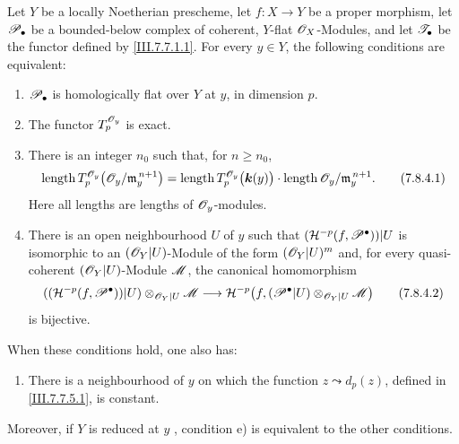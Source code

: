 \begin{proposition}[7.8.4]
\label{III.7.8.4}
Let $Y$ be a locally Noetherian prescheme, let
$f:X\to Y$ be a proper morphism, let $\mathscr{P}_\bullet$ be a
bounded-below complex of coherent, $Y$-flat
$\mathscr{O}_X$-Modules, and let $\mathscr{T}_\bullet$ be the functor
defined by \eqref{III.7.7.1.1}.  For every $y\in Y$, the
following conditions are equivalent:
\begin{enumerate}
  \item[\textup{a)}] $\mathscr{P}_\bullet$ is homologically flat over $Y$
  at $y$, in dimension $p$.
  \item[\textup{b)}] The functor $T_p^{\mathscr{O}_y}$ is exact.
  \item[\textup{c)}] There is an integer $n_0$ such that, for
  $n\geq n_0$,
  \[
    \operatorname{length}
      T_p^{\mathscr{O}_y}
        \bigl(\mathscr{O}_y/\mathfrak m_y^{\,n+1}\bigr)
    =
    \operatorname{length}
      T_p^{\mathscr{O}_y}\bigl(\boldsymbol{k}(y)\bigr)
    \cdot
    \operatorname{length}
      \mathscr{O}_y/\mathfrak m_y^{\,n+1}.
    \tag{7.8.4.1}\label{III.7.8.4.1}
  \]
  Here all lengths are lengths of $\mathscr{O}_y$-modules.
  \item[\textup{d)}] There is an open neighbourhood $U$ of $y$ such
  that $(\mathcal{H}^{-p}(f,\mathscr{P}^\bullet))|U$
  is isomorphic to an $(\mathscr{O}_Y|U)$-Module of the form
  $(\mathscr{O}_Y|U)^m$ and, for every quasi-coherent
  $(\mathscr{O}_Y|U)$-Module $\mathscr{M}$, the canonical
  homomorphism
  \[
    ((\mathcal{H}^{-p}(f,\mathscr{P}^\bullet))|U)
      \otimes_{\mathscr{O}_Y|U}\mathscr{M}
    \longrightarrow
    \mathcal{H}^{-p}
      \bigl(f,(\mathscr{P}^\bullet|U)
        \otimes_{\mathscr{O}_Y|U}\mathscr{M}\bigr)
    \tag{7.8.4.2}\label{III.7.8.4.2}
  \]
  is bijective.
\end{enumerate}
When these conditions hold, one also has:
\begin{enumerate}
  \item[\textup{e)}] There is a neighbourhood of $y$ on which the
  function $z\leadsto d_p(z)$, defined in
  \eqref{III.7.7.5.1}, is constant.
\end{enumerate}
Moreover, if $Y$ is \textup{reduced} at $y$ ,
condition e) is equivalent to the other conditions.
\end{proposition}

